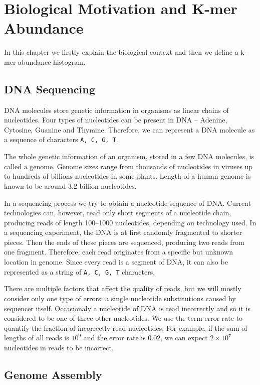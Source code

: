 \chapter{Biological Motivation and K-mer Abundance}

In this chapter we firstly explain the biological context and then we define a k-mer abundance histogram.

\section{DNA Sequencing}

DNA molecules store genetic information in organisms as linear chains of nucleotides.
Four types of nucleotides can be present in DNA -- Adenine, Cytosine, Guanine and Thymine.
Therefore, we can represent a DNA molecule as a sequence of characters \texttt{A, C, G, T}.

The whole genetic information of an organism, stored in a few DNA molecules, is called a genome.
Genome sizes range from thousands of nucleotides in viruses up to hundreds of billions nucleotides in some plants.
Length of a human genome is known to be around 3.2 billion nucleotides.

In a sequencing process we try to obtain a nucleotide sequence of DNA. Current technologies can, however, read only
short segments of a nucleotide chain, producing reads of length 100--1000 nucleotides, depending on technology used. 
In a sequencing experiment, the DNA is at first randomly fragmented to shorter pieces. Then the ends of these pieces
are sequenced, producing two reads from one fragment. Therefore, each read originates from a specific but unknown location in genome. 
Since every read is a segment of DNA, it can also be represented as a string of \texttt{A, C, G, T} characters.

There are multiple factors that affect the quality of reads, but we will mostly consider only one type of errors: 
a single nucleotide substitutions caused by sequencer itself. Occasionaly a nucleotide of DNA is
read incorrectly and so it is considered to be one of three other nucleotides. We use the term error rate to
quantify the fraction of incorrectly read nucleotides. For example, if the sum of lengths of all reads is $10^9$
and the error rate is $0.02$, we can expect $2 \times 10^7$ nucleotides in reads to be incorrect.

\section{Genome Assembly}

